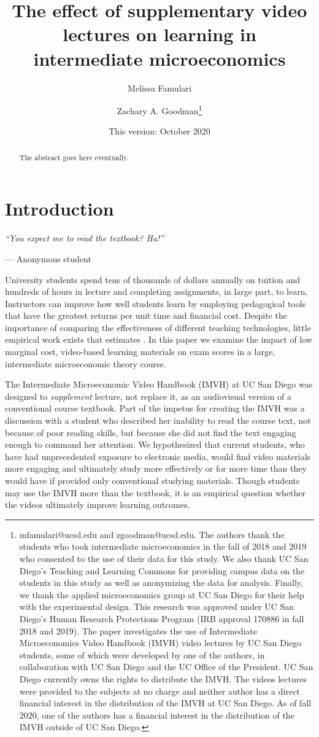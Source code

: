 \documentclass[12pt]{article}
\title{The effect of supplementary video lectures on learning in intermediate microeconomics}
\author{Melissa Famulari}
\author{Zachary A. Goodman\thanks{mfamulari@ucsd.edu and zgoodman@ucsd.edu. The authors thank the students who took intermediate microeconomics in the fall of 2018 and 2019 who consented to the use of their data for this study.  We also thank UC San Diego's Teaching and Learning Commons for providing campus data on the students in this study as well as anonymizing the data for analysis.  Finally, we thank the applied microeconomics group at UC San Diego for their help with the experimental design.  This research was approved under UC San Diego's Human Research Protections Program (IRB approval 170886 in fall 2018 and 2019).  The paper investigates the use of Intermediate Microeconomics Video Handbook (IMVH) video lectures by UC San Diego students, some of which were developed by one of the authors, in collaboration with UC San Diego and the UC Office of the President.  UC San Diego currently owns the rights to distribute the IMVH.  The videos lectures were provided to the subjects at no charge and neither author has a direct financial interest in the distribution of the IMVH at UC San Diego.  As of fall 2020, one of the authors has a financial interest in the distribution of the IMVH outside of UC San Diego.}}
\affil{University of California, San Diego}
\date{This version: October 2020} %
\begin{document}
\maketitle 
\begin{abstract}
	The abstract goes here eventually.
\end{abstract}

\newpage


\section{Introduction}

\epigraph{\textit{``You expect me to read the textbook? Ha!''}}{--- Anonymous student}\bigskip

University students spend tens of thousands of dollars annually on tuition and hundreds of hours in lecture and completing assignments, in large part, to learn. Instructors can improve how well students learn by employing pedagogical tools that have the greatest returns per unit time and financial cost. Despite the importance of comparing the effectiveness of different teaching technologies, little empirical work exists that estimates . In this paper we examine the impact of low marginal cost, video-based learning materials on exam scores in a large, intermediate microeconomic theory course. %

The Intermediate Microeconomic Video Handbook (IMVH) at UC San Diego was designed to \textit{supplement} lecture, not replace it, as an audiovisual version of a conventional course textbook. Part of the impetus for creating the IMVH was a discussion with a student who described her inability to read the course text, not because of poor reading skills, but because she did not find the text engaging enough to command her attention. We hypothesized that current students, who have had unprecedented exposure to electronic media, would find video materials more engaging and ultimately study more effectively or for more time than they would have if provided only conventional studying materials. Though students may use the IMVH more than the textbook, it is an empirical question whether the videos ultimately improve learning outcomes. 
\end{document}
